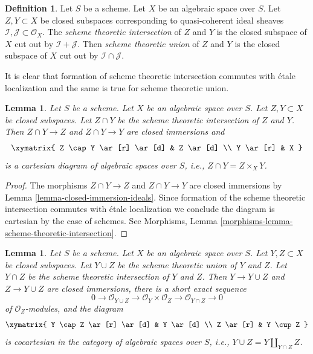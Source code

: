 \documentclass{stacks-project}
\theoremstyle{plain}
\newtheorem{lemma}[subsection]{Lemma}
\theoremstyle{definition}
\newtheorem{definition}[subsection]{Definition}
\theoremstyle{remark}
\numberwithin{equation}{subsection}
\begin{document}
\begin{definition}
\label{definition-scheme-theoretic-intersection-union}
Let $S$ be a scheme. Let $X$ be an algebraic space over $S$.
Let $Z, Y \subset X$ be closed subspaces
corresponding to quasi-coherent ideal sheaves
$\mathcal{I}, \mathcal{J} \subset \mathcal{O}_X$.
The {\it scheme theoretic intersection} of $Z$ and $Y$
is the closed subspace of $X$ cut out by $\mathcal{I} + \mathcal{J}$.
Then {\it scheme theoretic union} of $Z$ and $Y$
is the closed subspace of $X$ cut out by
$\mathcal{I} \cap \mathcal{J}$.
\end{definition}

\noindent
It is clear that formation of scheme theoretic intersection
commutes with \'etale localization and the same is true for
scheme theoretic union.

\begin{lemma}
\label{lemma-scheme-theoretic-intersection}
Let $S$ be a scheme. Let $X$ be an algebraic space over $S$.
Let $Z, Y \subset X$ be closed subspaces.
Let $Z \cap Y$ be the scheme theoretic intersection of $Z$ and $Y$.
Then $Z \cap Y \to Z$ and $Z \cap Y \to Y$ are closed immersions
and
$$
\xymatrix{
Z \cap Y \ar[r] \ar[d] & Z \ar[d] \\
Y \ar[r] & X
}
$$
is a cartesian diagram of algebraic spaces over $S$, i.e.,
$Z \cap Y = Z \times_X Y$.
\end{lemma}

\begin{proof}
The morphisms $Z \cap Y \to Z$ and $Z \cap Y \to Y$ are closed immersions
by Lemma \ref{lemma-closed-immersion-ideals}.
Since formation of the scheme theoretic intersection commutes
with \'etale localization we conclude the diagram is cartesian
by the case of schemes. See
Morphisms, Lemma \ref{morphisms-lemma-scheme-theoretic-intersection}.
\end{proof}

\begin{lemma}
\label{lemma-scheme-theoretic-union}
Let $S$ be a scheme. Let $X$ be an algebraic space over $S$.
Let $Y, Z \subset X$ be closed subspaces.
Let $Y \cup Z$ be the scheme theoretic union of $Y$ and $Z$.
Let $Y \cap Z$ be the scheme theoretic intersection of $Y$ and $Z$.
Then $Y \to Y \cup Z$ and $Z \to Y \cup Z$ are closed immersions,
there is a short exact sequence
$$
0 \to \mathcal{O}_{Y \cup Z} \to \mathcal{O}_Y \times \mathcal{O}_Z
\to \mathcal{O}_{Y \cap Z} \to 0
$$
of $\mathcal{O}_Z$-modules, and the diagram
$$
\xymatrix{
Y \cap Z \ar[r] \ar[d] & Y \ar[d] \\
Z \ar[r] & Y \cup Z
}
$$
is cocartesian in the category of algebraic spaces over $S$, i.e.,
$Y \cup Z = Y \amalg_{Y \cap Z} Z$.
\end{lemma}
\end{document}
